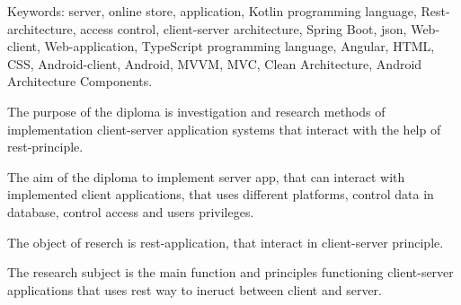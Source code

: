 Keywords: server, online store, application, Kotlin programming language, Rest-architecture, access control, client-server architecture, Spring Boot, json, Web-client, Web-application, TypeScript programming language, Angular, HTML, CSS, Android-client, Android, MVVM, MVC, Clean Architecture, Android Architecture Components.

The purpose of the diploma is investigation and research methods of implementation client-server application systems that interact with the help of rest-principle.

The aim of the diploma to implement server app, that can interact with implemented client applications, that uses different platforms, control data in database, control access and users privileges.

The object of reserch is rest-application, that interact in client-server principle.

The research subject is the main function and principles functioning client-server applications that uses rest way to ineruct between client and server.